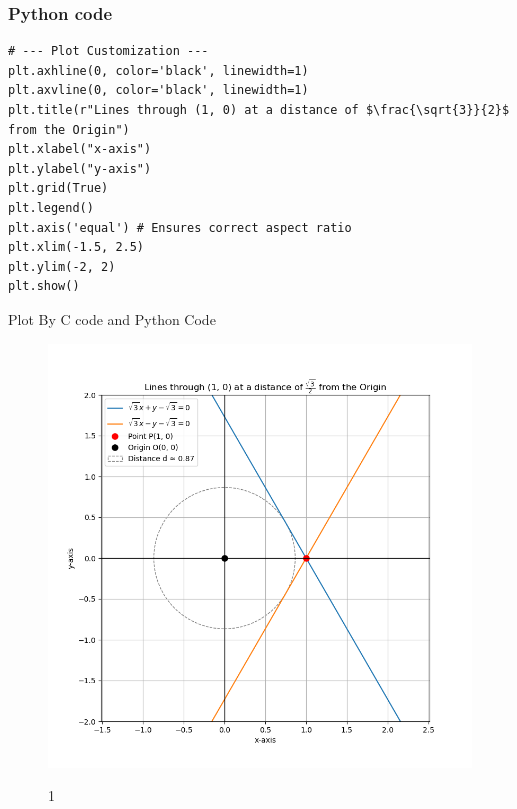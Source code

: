 \documentclass{beamer}
\begin{document}
\begin{frame}[fragile]
\frametitle{Python code}
\begin{lstlisting}
# --- Plot Customization ---
plt.axhline(0, color='black', linewidth=1)
plt.axvline(0, color='black', linewidth=1)
plt.title(r"Lines through (1, 0) at a distance of $\frac{\sqrt{3}}{2}$ from the Origin")
plt.xlabel("x-axis")
plt.ylabel("y-axis")
plt.grid(True)
plt.legend()
plt.axis('equal') # Ensures correct aspect ratio
plt.xlim(-1.5, 2.5)
plt.ylim(-2, 2)
plt.show()
\end{lstlisting}
\end{frame}
\begin{frame}{Plot By C code and Python Code}
    \begin{figure}
    \centering
    \includegraphics[width=0.7\columnwidth]{figs/Figure_1.png}
    \label{fig:placeholder}
    \caption{1}
\end{figure}
\end{frame}
\end{document}
